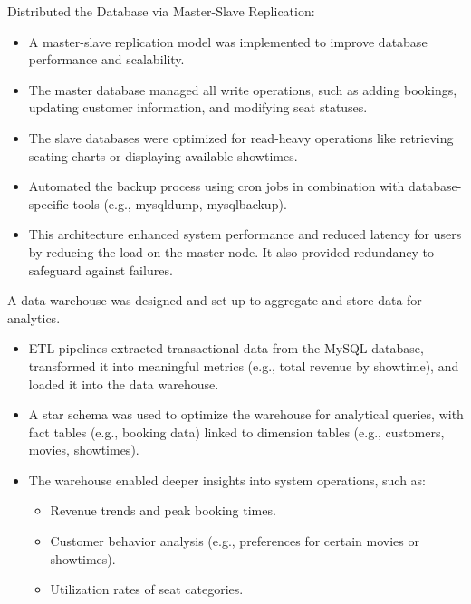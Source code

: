 \documentclass[letterpaper,11pt]{article}
\newcommand{\resumeItem}[1]{
  \item\small{
    {#1 \vspace{-2pt}}
  }
}
\begin{document}
    \resumeItem{Distributed the Database via Master-Slave Replication:
        \begin{itemize}
            \item A master-slave replication model was implemented to improve database performance and scalability.
            \item The master database managed all write operations, such as adding bookings, updating customer information, and modifying seat statuses.
            \item The slave databases were optimized for read-heavy operations like retrieving seating charts or displaying available showtimes.
            \item Automated the backup process using cron jobs in combination with database-specific tools (e.g., mysqldump, mysqlbackup).
            \item This architecture enhanced system performance and reduced latency for users by reducing the load on the master node. It also provided redundancy to safeguard against failures.
        \end{itemize}
    }
    
    \resumeItem{A data warehouse was designed and set up to aggregate and store data for analytics.
        \begin{itemize}

            \item ETL pipelines extracted transactional data from the MySQL database, transformed it into meaningful metrics (e.g., total revenue by showtime), and loaded it into the data warehouse.
            \item A star schema was used to optimize the warehouse for analytical queries, with fact tables (e.g., booking data) linked to dimension tables (e.g., customers, movies, showtimes).
            \item The warehouse enabled deeper insights into system operations, such as:
                \begin{itemize}
                    \item Revenue trends and peak booking times.
                    \item Customer behavior analysis (e.g., preferences for certain movies or showtimes).
                    \item Utilization rates of seat categories.
                \end{itemize}
        \end{itemize}
    }
    
\end{document}
